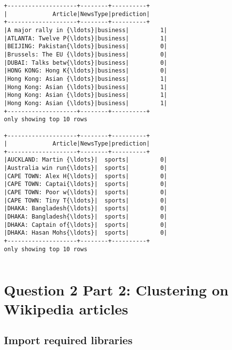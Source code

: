 \documentclass{report}
\begin{document}
    \begin{Verbatim}[commandchars=\\\{\}]
+--------------------+--------+----------+
|             Article|NewsType|prediction|
+--------------------+--------+----------+
|A major rally in {\ldots}|business|         1|
|ATLANTA: Twelve P{\ldots}|business|         1|
|BEIJING: Pakistan{\ldots}|business|         0|
|Brussels: The EU {\ldots}|business|         0|
|DUBAI: Talks betw{\ldots}|business|         0|
|HONG KONG: Hong K{\ldots}|business|         0|
|Hong Kong: Asian {\ldots}|business|         1|
|Hong Kong: Asian {\ldots}|business|         1|
|Hong Kong: Asian {\ldots}|business|         1|
|Hong Kong: Asian {\ldots}|business|         1|
+--------------------+--------+----------+
only showing top 10 rows

+--------------------+--------+----------+
|             Article|NewsType|prediction|
+--------------------+--------+----------+
|AUCKLAND: Martin {\ldots}|  sports|         0|
|Australia win run{\ldots}|  sports|         0|
|CAPE TOWN: Alex H{\ldots}|  sports|         0|
|CAPE TOWN: Captai{\ldots}|  sports|         0|
|CAPE TOWN: Poor w{\ldots}|  sports|         0|
|CAPE TOWN: Tiny T{\ldots}|  sports|         0|
|DHAKA: Bangladesh{\ldots}|  sports|         0|
|DHAKA: Bangladesh{\ldots}|  sports|         0|
|DHAKA: Captain of{\ldots}|  sports|         0|
|DHAKA: Hasan Mohs{\ldots}|  sports|         0|
+--------------------+--------+----------+
only showing top 10 rows


    \end{Verbatim}

\chapter{Question 2 Part 2: Clustering on Wikipedia
articles}\label{question-2-part-2-clustering-on-wikipedia-articles}

\section{Import required libraries}\label{import-required-libraries}
\end{document}
